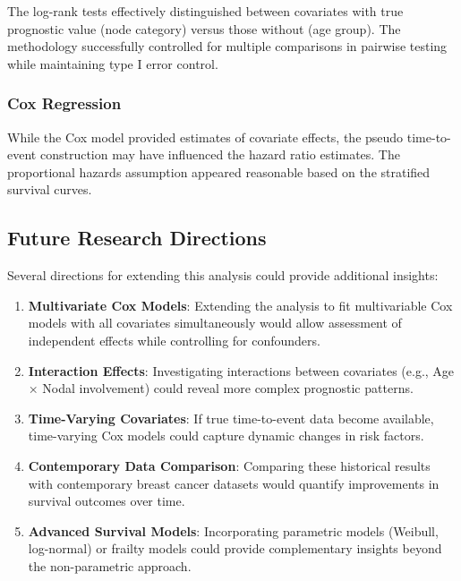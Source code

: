 \documentclass[12pt,a4paper]{article}
\begin{document}
The log-rank tests effectively distinguished between covariates with true prognostic value (node category) versus those without (age group). The methodology successfully controlled for multiple comparisons in pairwise testing while maintaining type I error control.

\subsubsection{Cox Regression}

While the Cox model provided estimates of covariate effects, the pseudo time-to-event construction may have influenced the hazard ratio estimates. The proportional hazards assumption appeared reasonable based on the stratified survival curves.

\subsection{Future Research Directions}

Several directions for extending this analysis could provide additional insights:

\begin{enumerate}
    \item \textbf{Multivariate Cox Models}: Extending the analysis to fit multivariable Cox models with all covariates simultaneously would allow assessment of independent effects while controlling for confounders.
    
    \item \textbf{Interaction Effects}: Investigating interactions between covariates (e.g., Age × Nodal involvement) could reveal more complex prognostic patterns.
    
    \item \textbf{Time-Varying Covariates}: If true time-to-event data become available, time-varying Cox models could capture dynamic changes in risk factors.
    
    \item \textbf{Contemporary Data Comparison}: Comparing these historical results with contemporary breast cancer datasets would quantify improvements in survival outcomes over time.
    
    \item \textbf{Advanced Survival Models}: Incorporating parametric models (Weibull, log-normal) or frailty models could provide complementary insights beyond the non-parametric approach.
\end{enumerate}
\end{document}
